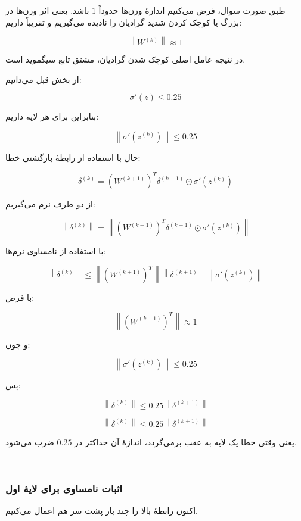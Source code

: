 \documentclass[12pt,a4paper]{article}
\begin{document}
طبق صورت سوال، فرض می‌کنیم اندازهٔ وزن‌ها حدوداً \(1\) باشد. یعنی اثر وزن‌ها در بزرگ یا کوچک کردن شدید گرادیان را نادیده می‌گیریم و تقریباً داریم:

\[
\left\| W^{(k)} \right\| \approx 1
\]

در نتیجه عامل اصلی کوچک شدن گرادیان، مشتق تابع سیگموید است.

از بخش قبل می‌دانیم:

\[
\sigma'(z)\leq 0.25
\]

بنابراین برای هر لایه داریم:

\[
\left\| \sigma'(z^{(k)}) \right\| \leq 0.25
\]

حال با استفاده از رابطهٔ بازگشتی خطا:

\[
\delta^{(k)}
=
\left(W^{(k+1)}\right)^T
\delta^{(k+1)}
\odot
\sigma'(z^{(k)})
\]

از دو طرف نرم می‌گیریم:

\[
\left\|\delta^{(k)}\right\|
=
\left\|
\left(W^{(k+1)}\right)^T
\delta^{(k+1)}
\odot
\sigma'(z^{(k)})
\right\|
\]

با استفاده از نامساوی نرم‌ها:

\[
\left\|\delta^{(k)}\right\|
\leq
\left\|
\left(W^{(k+1)}\right)^T
\right\|
\left\|\delta^{(k+1)}\right\|
\left\|\sigma'(z^{(k)})\right\|
\]

با فرض:

\[
\left\|
\left(W^{(k+1)}\right)^T
\right\|
\approx 1
\]

و چون:

\[
\left\|\sigma'(z^{(k)})\right\|\leq 0.25
\]

پس:

\[
\left\|\delta^{(k)}\right\|
\leq
0.25
\left\|\delta^{(k+1)}\right\|
\]

\begin{tcolorbox}[
	colback=softgreen,
	colframe=mygreen,
	title=یک گام پس‌انتشار
	]
	\[
	\boxed{
		\left\|\delta^{(k)}\right\|
		\leq
		0.25
		\left\|\delta^{(k+1)}\right\|
	}
	\]
	
	یعنی وقتی خطا یک لایه به عقب برمی‌گردد، اندازهٔ آن حداکثر در \(0.25\) ضرب می‌شود.
\end{tcolorbox}

---

\subsubsection{اثبات نامساوی برای لایهٔ اول}

اکنون رابطهٔ بالا را چند بار پشت سر هم اعمال می‌کنیم.
\end{document}
